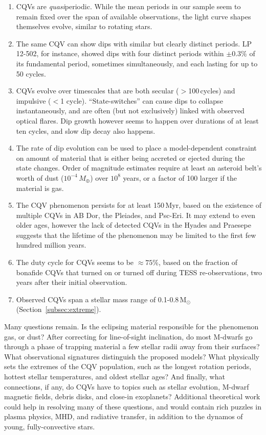 \documentclass[11pt,twocolumn,tighten]{aastex63}
\begin{document}
\begin{enumerate}
  \item CQVs are {\it quasi}periodic.  While the mean periods in our
    sample seem to remain fixed over the span of available
    observations, the light curve shapes themselves evolve, similar to
    rotating stars.
  \item The same CQV can show dips with similar but clearly
    distinct periods.  LP 12-502, for instance, showed dips with four
    distinct periods within $\pm 0.3\%$ of its fundamental period,
    sometimes simultaneously, and each lasting for up to 50 cycles.
    \item CQVs evolve over timescales that are both secular
    ($>$100\,cycles) and impulsive ($<$1 cycle).  ``State-switches''
    can cause dips to collapse instantaneously, and are often (but not
    exclusively) linked with observed optical flares.  Dip growth
    however seems to happen over durations of at least ten cycles, and
    slow dip decay also happens.
    \item The rate of dip evolution can be used to place a model-dependent
    constraint on amount of material that is either being accreted or ejected
    during the state changes.
    Order of magnitude estimates require at least an asteroid belt's worth
    of dust ($10^{-4}$\,$M_\oplus$) over $10^8$ years, or a factor of 100
    larger if the material is gas.
  \item The CQV phenomenon persists for at least 150\,Myr, based on
    the existence of multiple CQVs in AB Dor, the Pleiades, and
    Psc-Eri.  It may extend to even older ages, however the lack of
    detected CQVs in the Hyades and Praesepe suggests that the
    lifetime of the phenomenon may be limited to the first few hundred
    million years.
  \item The duty cycle for CQVs seems to be $\approx 75$\%, based on
    the fraction of bonafide CQVs that turned on or turned off during
    TESS re-observations, two years after their initial observation.
  \item Observed CQVs span a stellar mass range of 0.1-0.8\,M$_\odot$ (Section~\ref{subsec:extreme}).
\end{enumerate}

Many questions remain.  Is the eclipsing material responsible for the
phenomenon gas, or dust?  After correcting for line-of-sight
inclination, do most M-dwarfs go through a phase of trapping material
a few stellar radii away from their surfaces?  What observational
signatures distinguish the proposed models?
What physically sets the extremes of the
CQV population, such as the longest rotation periods, hottest stellar
temperatures, and oldest stellar ages?  And finally, what connections,
if any, do CQVs have to topics such as stellar evolution, M-dwarf
magnetic fields, debris disks, and close-in exoplanets?  
Additional theoretical work could help in resolving many of these questions,
and would contain rich puzzles in plasma physics, MHD, and radiative transfer, in
addition to the dynamos of young, fully-convective stars.
\end{document}
